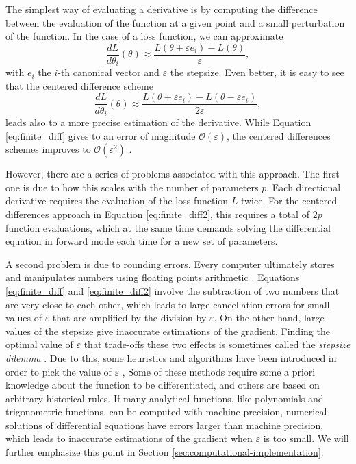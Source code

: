 The simplest way of evaluating a derivative is by computing the difference between the evaluation of the function at a given point and a small perturbation of the function. 
In the case of a loss function, we can approximate
\begin{equation}
 \frac{dL}{d\theta_i} (\theta) \approx \frac{L(\theta + \varepsilon e_i ) - L(\theta)}{\varepsilon},
 \label{eq:finite_diff}
\end{equation}
with $e_i$ the $i$-th canonical vector and $\varepsilon$ the stepsize. 
Even better, it is easy to see that the centered difference scheme
\begin{equation}
 \frac{dL}{d\theta_i} (\theta) \approx \frac{L(\theta + \varepsilon e_i ) - L(\theta - \varepsilon e_i)}{2\varepsilon},
 \label{eq:finite_diff2}
\end{equation}
leads also to a more precise estimation of the derivative. 
While Equation \eqref{eq:finite_diff} gives to an error of magnitude $\mathcal O (\varepsilon)$, the centered differences schemes improves to $\mathcal O (\varepsilon^2)$ \cite{ascher2008-numerical-methods}. 
 
However, there are a series of problems associated with this approach.
The first one is due to how this scales with the number of parameters $p$.
Each directional derivative requires the evaluation of the loss function $L$ twice.
For the centered differences approach in Equation \eqref{eq:finite_diff2}, this requires a total of $2p$ function evaluations, which at the same time demands solving the differential equation in forward mode each time for a new set of parameters.

A second problem is due to rounding errors.
Every computer ultimately stores and manipulates numbers using floating points arithmetic \cite{Goldberg_1991_floatingpoint}. 
Equations \eqref{eq:finite_diff} and \eqref{eq:finite_diff2} involve the subtraction of two numbers that are very close to each other, which leads to large cancellation errors for small values of $\varepsilon$ that are amplified by the division by $\varepsilon$.
On the other hand, large values of the stepsize give inaccurate estimations of the gradient. 
Finding the optimal value of $\varepsilon$ that trade-offs these two effects is sometimes called the \textit{stepsize dilemma} \cite{mathur2012stepsize-finitediff}. 
Due to this, some heuristics and algorithms have been introduced in order to pick the value of $\varepsilon$ \cite{mathur2012stepsize-finitediff, BARTON_1992_finite_diff, SUNDIALS-hindmarsh2005sundials}, 
Some of these methods require some a priori knowledge about the function to be differentiated, and others are based on arbitrary historical rules. 
If many analytical functions, like polynomials and trigonometric functions, can be computed with machine precision, numerical solutions of differential equations have errors larger than machine precision, which leads to inaccurate estimations of the gradient when $\varepsilon$ is too small. 
We will further emphasize this point in Section \ref{sec:computational-implementation}.

